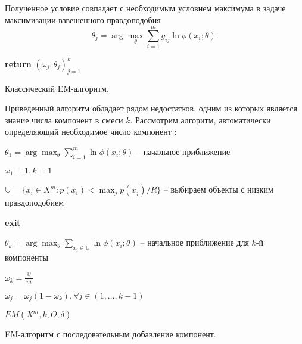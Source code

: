 \documentclass[12pt,a4paper]{report}
\begin{document}
Полученное условие совпадает с необходимым условием максимума в задаче максимизации взвешенного правдоподобия
\begin{equation*}
\theta_j = \arg \max_{\theta} \sum_{i=1}^{m}g_{ij}  \ln\phi(x_i; \theta).
\end{equation*}


\begin{algorithm}[H]
\SetAlgoLined
{}

\textbf{return} $(\omega_j, \theta_j)_{j=1}^k$
\caption{Классический EM-алгоритм.}
\label{alg:EM}
\end{algorithm}

Приведенный алгоритм обладает рядом недостатков, одним из которых является знание числа компонент в смеси  $k$. Рассмотрим алгоритм, автоматически определяющий необходимое число компонент \cite{Kem}:

\begin{algorithm}[H]
\SetAlgoLined
{}

$\theta_1 =  \arg \max_{\theta} \sum_{i=1}^{m} \ln\phi(x_i; \theta)$ -- начальное приближение

$\omega_1 = 1, k = 1$

 {
	$\mathbb{U} = \{x_i \in X^m: p(x_i) < \max_j p(x_j) / R\}$ -- выбираем объекты с низким правдоподобием
	
	 {
		\textbf{exit}
	}
	
	$\theta_k =  \arg \max_{\theta} \sum_{x_i \in \mathbb{U}} \ln\phi(x_i; \theta)$ -- начальное приближение для $k$-й компоненты
	
	$\omega_k = \frac{|\mathbb{U}|}{m}$
	
	$\omega_j = \omega_j(1-\omega_k), \forall j \in (1, \dots, k-1)$
	
	$EM(X^m, k, \Theta, \delta)$
}
\caption{EM-алгоритм с последовательным добавление компонент.}
\label{alg:KEM}
\end{algorithm}
\end{document}
